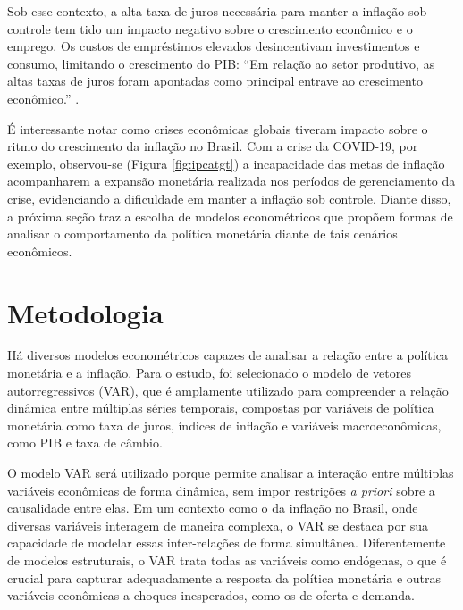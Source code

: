 \documentclass[12pt,oneside,a4paper,chapter=TITLE,english,brazil,sumario=abnt-6027-2012]{abntex2}
\begin{document}
Sob esse contexto, a alta taxa de juros necessária para manter a inflação sob controle tem tido um impacto negativo sobre o crescimento econômico e o emprego. Os custos de empréstimos elevados desincentivam investimentos e consumo, limitando o crescimento do PIB: ``Em relação ao setor produtivo, as altas taxas de juros foram apontadas como principal entrave ao crescimento econômico.'' \cite{omar_juros08}.

É interessante notar como crises econômicas	globais tiveram impacto sobre o ritmo do crescimento da inflação no Brasil. Com a crise da COVID-19, por exemplo, observou-se (Figura \ref{fig:ipcatgt}) a incapacidade das metas de inflação acompanharem a expansão monetária realizada nos períodos de gerenciamento da crise, evidenciando a dificuldade em manter a inflação sob controle. Diante disso, a próxima seção traz a escolha de modelos econométricos que propõem formas de analisar o comportamento da política monetária diante de tais cenários econômicos.



\chapter{Metodologia}

Há diversos modelos econométricos capazes de analisar a relação entre a política monetária e a inflação. Para o estudo, foi selecionado o modelo de vetores autorregressivos (VAR), que é amplamente utilizado para compreender a relação dinâmica entre múltiplas séries temporais, compostas por variáveis de política monetária como taxa de juros, índices de inflação e variáveis macroeconômicas, como PIB e taxa de câmbio. 

O modelo VAR será utilizado porque permite analisar a interação entre múltiplas variáveis econômicas de forma dinâmica, sem impor restrições \textit{a priori} sobre a causalidade entre elas. Em um contexto como o da inflação no Brasil, onde diversas variáveis interagem de maneira complexa, o VAR se destaca por sua capacidade de modelar essas inter-relações de forma simultânea. Diferentemente de modelos estruturais, o VAR trata todas as variáveis como endógenas, o que é crucial para capturar adequadamente a resposta da política monetária e outras variáveis econômicas a choques inesperados, como os de oferta e demanda.
\end{document}
